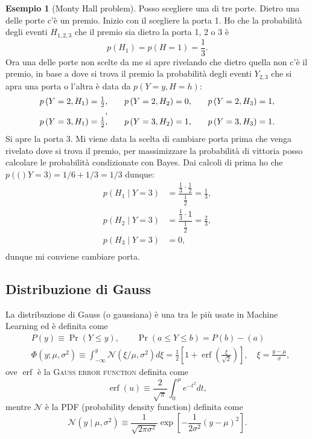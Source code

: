 \documentclass[10pt]{article}
\DeclareMathOperator{\pr}{Pr}
\DeclareMathOperator{\erf}{erf}
\newcommand{\im}[1]{\textsc{#1}}
\newcommand{\cond}{\mid}
\newcommand{\pare}[1]{
	\ensuremath{\left(#1\right)}
}
\newcommand{\spare}[1]{
	\ensuremath{\left[#1\right]}
}
\theoremstyle{definition}
\newtheorem{example}{Esempio}[section]
\begin{document}
\begin{example}[Monty Hall problem]
Posso scegliere una di tre porte. Dietro una delle porte c'è un premio. Inizio con il scegliere la porta 1. Ho che la probabilità degli eventi $H_{1,2,3}$ che il premio sia dietro la porta 1, 2 o 3 è
\[
p\pare{H_1} = p\pare{H=1} = \frac{1}{3}.
\]
Ora una delle porte non scelte da me si apre rivelando che dietro quella non c'è il premio, in base a dove si trova il premio la probabilità degli eventi $Y_{2, 3}$ che si apra una porta o l'altra è data da $p\pare{Y=y, H=h}$:
\[
\begin{array}{l@{,\qquad}l@{,\qquad}l}
p\pare{Y=2, H_1} = \frac{1}{2} & p\pare{Y=2, H_2} = 0 & p\pare{Y=2, H_3} = 1, \\
\\
p\pare{Y=3, H_1} = \frac{1}{2} & p\pare{Y=3, H_2} = 1 & p\pare{Y=3, H_3} = 1. \\
\end{array}
\]
Si apre la porta 3. Mi viene data la scelta di cambiare porta prima che venga rivelato dove si trova il premio, per massimizzare la probabilità di vittoria posso calcolare le probabilità condizionate con Bayes. Dai calcoli di prima ho che $p\pare(Y=3) = 1/6 + 1/3 = 1/3$ dunque:
\begin{equation}
\begin{split}
p\pare{H_1\cond Y=3} &= \dfrac{\frac{1}{3}\cdot\frac{1}{2}}{\frac{1}{2}} = \frac{1}{3}, \\
p\pare{H_2\cond Y=3} &= \dfrac{\frac{1}{3}\cdot 1}{\frac{1}{2}} = \frac{2}{3}, \\
p\pare{H_3\cond Y=3} &= 0, \\
\end{split}
\end{equation}
dunque mi conviene cambiare porta.
\end{example}

\subsection{Distribuzione di Gauss}
La distribuzione di Gauss (o gaussiana) è una tra le più usate in Machine Learning ed è definita come
\begin{equation}
\begin{split}
&P\pare{y} \equiv \pr\pare{Y\leq y},\qquad \pr\pare{a \leq Y \leq b} = P\pare{b} - \pare{a} \\
&\Phi\pare{y;\mu, \sigma^2} \equiv \int_{-\infty}^y \mathcal{N}\pare{\xi/\mu, \sigma^2}d\xi = \frac{1}{2}\spare{1 + \erf\pare{\frac{\xi}{\sqrt{2}}}},\quad \xi = \frac{y - \mu}{\sigma},
\end{split}
\end{equation}
ove $\erf$ è la \im{Gauss error function} definita come
\begin{equation}
\erf\pare{u} \equiv \frac{2}{\sqrt{\pi}} \int_0^\mu e^{-t^2}dt,
\end{equation}
mentre $\mathcal{N}$ è la PDF (probability density function) definita come
\begin{equation}
\mathcal{N}\pare{y\cond\mu,\sigma^2} \equiv \frac{1}{\sqrt{2\pi\sigma^2}}\exp\spare{-\frac{1}{2\sigma^2}\pare{y-\mu}^2}.
\end{equation}
\end{document}
